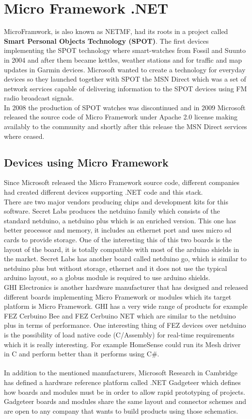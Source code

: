 \section{Micro Framework .NET}\label{S:MicroFramework-dotNet}
MicroFramwork, is also known as NETMF, had its roots in a project called \textbf{Smart Personal Objects Technology (SPOT)}. The first devices implementing the SPOT technology where smart-watches from Fossil and Suunto in 2004 and after them became kettles, weather stations and for traffic and map updates in Garmin devices. Microsoft wanted to create a technology for everyday devices so they launched together with SPOT the MSN Direct which was a set of network services capable of delivering information to the SPOT devices using FM radio broadcast signals.
\\
In 2008 the production of SPOT watches was discontinued and in 2009 Microsoft released the source code of Micro Framework under Apache 2.0 license making availably to the community and shortly after this release the MSN Direct services where ceased.

\subsection{Devices using Micro Framework}\label{SS:MicroFramework-Devices}
Since Microsoft released the Micro Framework source code, different companies had created different devices supporting .NET code and this stack.
\\
There are two major vendors producing chips and development kits for this software. Secret Labs produces the netduino family which consists of the standard netduino, a netduino plus which is an enriched version. This one has better processor and memory, it includes an ethernet port and uses micro sd cards to provide storage. One of the interesting this of this two boards is the layout of the board, it is totally compatible with most of the arduino shields in the market.
Secret Labs has another board called netduino go, which is similar to netduino plus but without storage, ethernet and it does not use the typical arduino layout, so a globus module is required to use arduino shields.
\\
GHI Electronics is another hardware manufacturer that has designed and released different boards implementing Micro Framework or modules which its target platform is Micro Framework. GHI has a very wide range of products for example FEZ Cerbuino Bee and FEZ Cerbuino NET which are similar to the netduino plus in terms of performance. One interesting thing of FEZ devices over netduino is the possibility of load native code (C/Assembly) for real-time requirements which it is really interesting. For example HomeSense could run its Mesh driver in C and perform better than it performs using C\#.
\\
\\
In addition to the mentioned manufacturers, Microsoft Research in Cambridge has defined a hardware reference platform called .NET Gadgeteer which defines how boards and modules must be in order to allow rapid prototyping of projects. Gadgeteer boards and modules share the same layout and connector schemes and are open to any company that wants to build products using those schematics.


